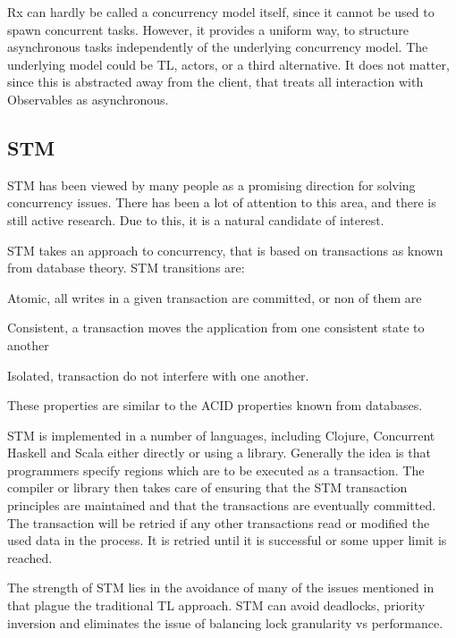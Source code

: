 \ac{Rx} can hardly be called a concurrency model itself, since it cannot be used to spawn concurrent tasks. However, it provides a uniform way, to structure asynchronous tasks independently of the underlying concurrency model. The underlying model could be \ac{TL}, actors, or a third alternative. It does not matter, since this is abstracted away from the client, that treats all interaction with Observables as asynchronous.

\subsection{\acl{STM}}
\ac{STM} has been viewed by many people as a promising direction for solving concurrency issues\cite{sutter2005software}. There has been a lot of attention to this area, and there is still active research. Due to this, it is a natural candidate of interest.

\ac{STM} takes an approach to concurrency, that is based on transactions as known from database theory\cite[p. 1]{shavit1997software}. \ac{STM} transitions are:
\begin{inparaenum}[(1)]
\item Atomic, all writes in a given transaction are committed, or non of them are
\item Consistent, a transaction moves the application from one consistent state to another
\item Isolated, transaction do not interfere with one another\cite[p. 14]{kalin2012clojure}.
\end{inparaenum} 
These properties are similar to the \ac{ACID} properties known from databases\cite[p. 754]{elmasri2011fundamentals}.

\ac{STM} is implemented in a number of languages, including Clojure\cite[p. 101]{sevenModels}, Concurrent Haskell\cite{harris2005composable} and Scala\cite{goodman2011muts} either directly or using a library. Generally the idea is that programmers specify regions which are to be executed as a transaction. The compiler or library then takes care of ensuring that the \ac{STM} transaction principles are maintained and that the transactions are eventually committed\cite[p. 1]{saha2006mcrt}. The transaction will be retried if any other transactions read or modified the used data in the process. It is retried until it is successful or some upper limit is reached.

The strength of \ac{STM} lies in the avoidance of many of the issues mentioned in  that plague the traditional \ac{TL} approach. \ac{STM} can avoid deadlocks, priority inversion and eliminates the issue of balancing lock granularity vs performance\cite[p. 1]{harris2005composable}.

